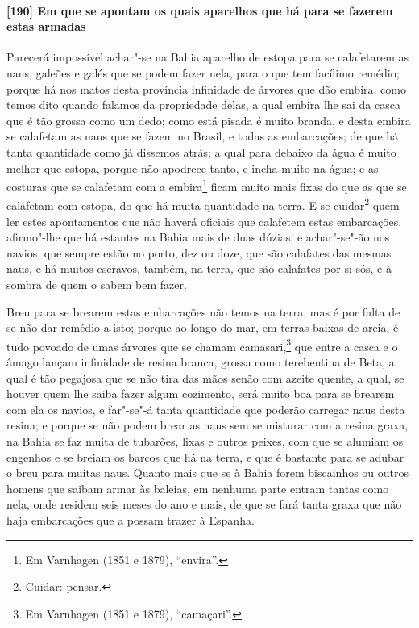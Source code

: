 \paragraph{[190] Em que se apontam os quais aparelhos que há para se fazerem estas armadas}\quad
Parecerá impossível achar"-se na Bahia aparelho de estopa para se calafetarem as naus,
galeões e galés que se podem fazer nela, para o que tem facílimo remédio; porque há nos
matos desta província infinidade de árvores que dão embira, como temos dito quando falamos
da propriedade delas, a qual embira lhe sai da casca que é tão grossa como um dedo; como
está pisada é muito branda, e desta embira se calafetam as naus que se fazem no Brasil, e
todas as embarcações; de que há tanta quantidade como já dissemos atrás; a qual para
debaixo da água é muito melhor que estopa, porque não apodrece tanto, e incha muito na
água; e as costuras que se calafetam com a embira\footnote{ Em Varnhagen (1851 e 1879),
``envira''.} ficam muito mais fixas do que as que se calafetam com estopa, do que há muita
quantidade na terra. E se cuidar\footnote{ Cuidar: pensar.} quem ler estes apontamentos
que não haverá oficiais que calafetem estas embarcações, afirmo"-lhe que há
estantes na Bahia mais de duas dúzias, e achar"-se"-ão nos navios, que sempre estão no
porto, dez ou doze, que são calafates das mesmas naus, e há muitos escravos, também, na
terra, que são calafates por si sós, e à sombra de quem o sabem bem fazer.

Breu para se brearem estas embarcações não temos na terra, mas é por falta de se não dar
remédio a isto; porque ao longo do mar, em terras baixas de areia, é tudo povoado de umas
árvores que se chamam camasari,\footnote{ Em Varnhagen (1851 e 1879), ``camaçari''.} que
entre a casca e o âmago lançam infinidade de resina branca, grossa como terebentina de
Beta, a qual é tão pegajosa que se não tira das mãos senão com azeite quente, a qual, se
houver quem lhe saiba fazer algum cozimento, será muito boa para se brearem com ela os
navios, e far"-se"-á tanta quantidade que poderão carregar naus desta resina; e porque se
não podem brear as naus sem se misturar com a resina graxa, na Bahia se faz muita de
tubarões, lixas e outros peixes, com que se alumiam os engenhos e se breiam os barcos que
há na terra, e que é bastante para se adubar o breu para muitas naus. Quanto mais que se à
Bahia forem biscainhos ou outros homens que saibam armar às baleias, em nenhuma parte
entram tantas como nela, onde residem seis meses do ano e mais, de que se fará tanta graxa
que não haja embarcações que a possam trazer à Espanha.

